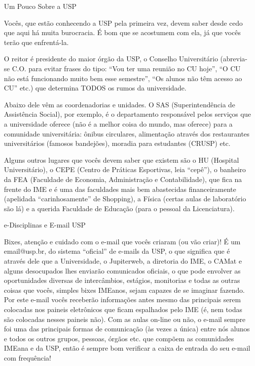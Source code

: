 \begin{secao}{Um Pouco Sobre a USP}

Vocês, que estão conhecendo a USP pela primeira vez, devem saber desde cedo que aqui
há muita burocracia. É bom que se acostumem com ela, já que vocês terão que enfrentá-la.

O reitor é presidente do maior órgão da USP, o Conselho Universitário (abrevia-se
C.O. para evitar frases do tipo: ``Vou ter uma reunião no CU hoje'', ``O CU não
está funcionando muito bem esse semestre'', ``Os alunos não têm acesso ao CU''
etc.) que determina TODOS os rumos da universidade.

Abaixo dele vêm as coordenadorias e unidades. O SAS (Superintendência de Assistência Social),
por exemplo, é o departamento responsável pelos serviços
que a universidade oferece (não é a melhor coisa do mundo, mas oferece) para a
comunidade universitária: ônibus circulares, alimentação através dos restaurantes
universitários (famosos bandejões), moradia para estudantes (CRUSP) etc.

Alguns outros lugares que vocês devem saber que existem são o HU (Hospital
Universitário), o CEPE (Centro de Práticas Esportivas, leia ``cepê''), o banheiro
da FEA (Faculdade de Economia, Administração e Contabilidade), que fica na
frente do IME e é uma das faculdades mais bem abastecidas financeiramente
(apelidada ``carinhosamente'' de Shopping), a Física (certas aulas de laboratório são lá)
 e a querida Faculdade de Educação (para o pessoal da Licenciatura).

\begin{subsecao}{e-Disciplinas e E-mail USP}

Bixes, atenção e cuidado com o e-mail que vocês criaram (ou vão criar)! É um
email@usp.br, do sistema ``oficial'' de e-mails da USP, o que significa que é
através dele que a Universidade, o Jupiterweb, a diretoria do IME, o CAMat e
alguns desocupados lhes enviarão comunicados oficiais, o que pode envolver as
oportunidades diversas de intercâmbios, estágios, monitorias e todas as outras coisas
que vocês, simples bixes IMEanos, sejam capazes de se imaginar fazendo. Por este e-mail
vocês receberão informações antes mesmo das principais serem colocadas nos paineis eletrônicos que
ficam espalhados pelo IME (é, nem todas são colocadas nesses paineis não).
Com as aulas on-line ou não, o e-mail sempre foi uma das principais formas de
comunicação (às vezes a única) entre nós alunos e todos os outros grupos, pessoas,
órgãos etc. que compõem as comunidades IMEana e da USP, então é sempre bom verificar
a caixa de entrada do seu e-mail com frequência! 


\end{subsecao}
\end{secao}
